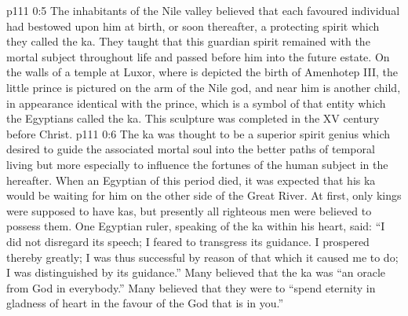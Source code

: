 \vs p111 0:5 The inhabitants of the Nile valley believed that each favoured individual had bestowed upon him at birth, or soon thereafter, a protecting spirit which they called the ka. They taught that this guardian spirit remained with the mortal subject throughout life and passed before him into the future estate. On the walls of a temple at Luxor, where is depicted the birth of Amenhotep III, the little prince is pictured on the arm of the Nile god, and near him is another child, in appearance identical with the prince, which is a symbol of that entity which the Egyptians called the ka. This sculpture was completed in the XV century before Christ.
\vs p111 0:6 The ka was thought to be a superior spirit genius which desired to guide the associated mortal soul into the better paths of temporal living but more especially to influence the fortunes of the human subject in the hereafter. When an Egyptian of this period died, it was expected that his ka would be waiting for him on the other side of the Great River. At first, only kings were supposed to have kas, but presently all righteous men were believed to possess them. One Egyptian ruler, speaking of the ka within his heart, said: “I did not disregard its speech; I feared to transgress its guidance. I prospered thereby greatly; I was thus successful by reason of that which it caused me to do; I was distinguished by its guidance.” Many believed that the ka was “an oracle from God in everybody.” Many believed that they were to “spend eternity in gladness of heart in the favour of the God that is in you.”
